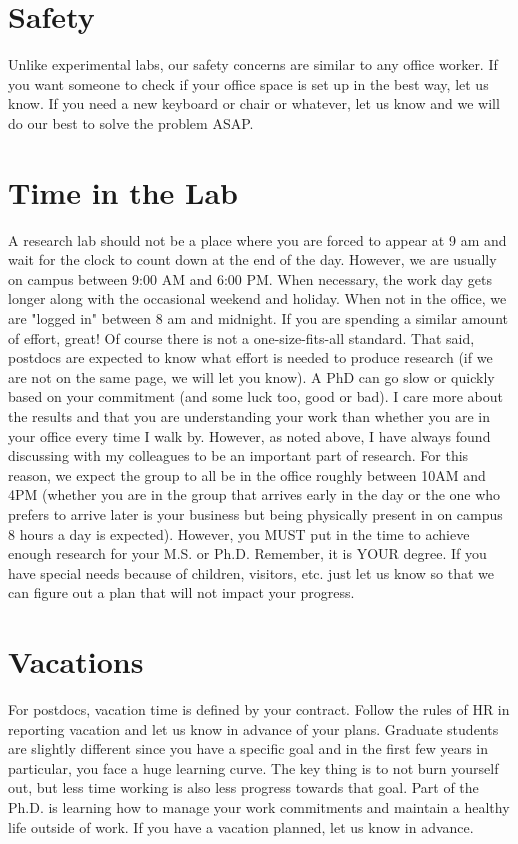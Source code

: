\documentclass[letterpaper]{article}
\begin{document}
\section*{Safety}

Unlike experimental labs, our safety concerns are similar to any office worker. If you want someone to check if your office space is set up in the best way, let us know. If you need a new keyboard or chair or whatever, let us know and we will do our best to solve the problem ASAP.

\section*{Time in the Lab}
A research lab should not be a place where you are forced to appear at 9 am and wait for the clock to count down at the end of the day. However, we are usually on campus between 9:00 AM and 6:00 PM. When necessary, the work day gets longer along with the occasional weekend and holiday. When not in the office, we are "logged in" between 8 am and midnight. If you are spending a similar amount of effort, great! Of course there is not a one-size-fits-all standard. That said, postdocs are expected to know what effort is needed to produce research (if we are not on the same page, we will let you know). A PhD can go slow or quickly based on your commitment (and some luck too, good or bad). I care more about the results and that you are understanding your work than whether you are in your office every time I walk by. However, as noted above, I have always found discussing with my colleagues to be an important part of research. For this reason, we expect the group to all be in the office roughly between 10AM and 4PM (whether you are in the group that arrives early in the day or the one who prefers to arrive later is your business but being physically present in on campus 8 hours a day is expected). However, you MUST put in the time to achieve enough research for your M.S. or Ph.D. Remember, it is YOUR degree. If you have special needs because of children, visitors, etc. just let us know so that we can figure out a plan that will not impact your progress.

\section*{Vacations}
For postdocs, vacation time is defined by your contract. Follow the rules of HR in reporting vacation and let us know in advance of your plans. Graduate students are slightly different since you have a specific goal and in the first few years in particular, you face a huge learning curve. The key thing is to not burn yourself out, but less time working is also less progress towards that goal. Part of the Ph.D. is learning how to manage your work commitments and maintain a healthy life outside of work. If you have a vacation planned, let us know in advance. 
\end{document}
